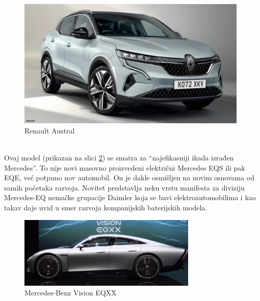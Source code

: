 \documentclass[a4paper]{article}
\begin{document}
\begin{figure}[h]
        \centering
        \includegraphics[width=110mm,scale=0.5]{Austral.jpg}
        \caption{Renault Austral}
        \label{fig:IMG_Austral}
        \end{figure}


\newpage

\\

    Ovaj model (prikazan na slici \ref{fig:IMG_Mercedes}) se smatra za  “najefikasniji ikada izrađen Mercedes”. To nije novi masovno proizvedeni električni Mercedes EQS ili pak EQE, već potpuno nov automobil. On je dakle osmišljen na novim osnovama od samih početaka razvoja. Novitet predstavlja neku vrstu manifesta za diviziju Mercedes-EQ nemačke grupacije Daimler koja se bavi elektroautomobilima i kao takav daje uvid u smer razvoja kompanijskih baterijskih modela.
 

\begin{figure}[h]
        \centering
        \includegraphics[width=85mm,scale=0.5]{Vision.png}
        \caption{Mercedes-Benz Vision EQXX}
        \label{fig:IMG_Mercedes}
        \end{figure}

\\
\end{document}

